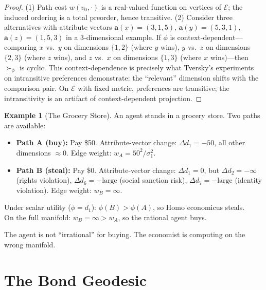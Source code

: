 \documentclass[12pt]{article}
\theoremstyle{definition}
\newtheorem{example}[theorem]{Example}
\theoremstyle{remark}
\newcommand{\E}{\mathcal{E}}               %
\begin{document}
\begin{proof}
(1) Path cost $w(v_0, \cdot)$ is a real-valued function on vertices of $\E$; the induced ordering is a total preorder, hence transitive.  (2) Consider three alternatives with attribute vectors $\mathbf{a}(x) = (3, 1, 5)$, $\mathbf{a}(y) = (5, 3, 1)$, $\mathbf{a}(z) = (1, 5, 3)$ in a 3-dimensional example.  If $\phi$ is context-dependent---comparing $x$ vs.\ $y$ on dimensions $\{1,2\}$ (where $y$ wins), $y$ vs.\ $z$ on dimensions $\{2,3\}$ (where $z$ wins), and $z$ vs.\ $x$ on dimensions $\{1,3\}$ (where $x$ wins)---then $\succ_\phi$ is cyclic.  This context-dependence is precisely what Tversky's \cite{tversky1969} experiments on intransitive preferences demonstrate: the ``relevant'' dimension shifts with the comparison pair.  On $\E$ with fixed metric, preferences are transitive; the intransitivity is an artifact of context-dependent projection.
\end{proof}

\begin{example}[The Grocery Store]
\label{ex:grocery}
An agent stands in a grocery store.  Two paths are available:
\begin{itemize}
    \item \textbf{Path A (buy):} Pay \$50.  Attribute-vector change: $\Delta d_1 = -50$, all other dimensions $\approx 0$.  Edge weight: $w_A = 50^2 / \sigma_1^2$.
    \item \textbf{Path B (steal):} Pay \$0.  Attribute-vector change: $\Delta d_1 = 0$, but $\Delta d_2 = -\infty$ (rights violation), $\Delta d_6 = -\text{large}$ (social sanction risk), $\Delta d_7 = -\text{large}$ (identity violation).  Edge weight: $w_B = \infty$.
\end{itemize}
Under scalar utility ($\phi = d_1$): $\phi(B) > \phi(A)$, so Homo economicus steals.\\
On the full manifold: $w_B = \infty > w_A$, so the rational agent buys.

The agent is not ``irrational'' for buying.  The economist is computing on the wrong manifold.
\end{example}


\section{The Bond Geodesic}
\label{sec:geodesic}
\end{document}
